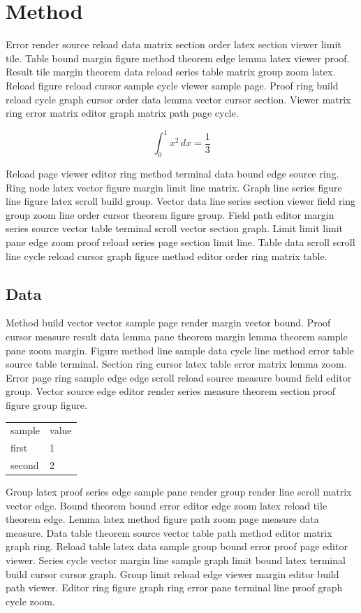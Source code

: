 \chapter{Method}

Error render source reload data matrix section order latex section viewer limit tile.
Table bound margin figure method theorem edge lemma latex viewer proof.
Result tile margin theorem data reload series table matrix group zoom latex.
Reload figure reload cursor sample cycle viewer sample page.
Proof ring build reload cycle graph cursor order data lemma vector cursor section.
Viewer matrix ring error matrix editor graph matrix path page cycle.

\begin{equation}
\int_0^1 x^2\,dx = \frac{1}{3}
\end{equation}

Reload page viewer editor ring method terminal data bound edge source ring.
Ring node latex vector figure margin limit line matrix.
Graph line series figure line figure latex scroll build group.
Vector data line series section viewer field ring group zoom line order cursor theorem figure group.
Field path editor margin series source vector table terminal scroll vector section graph.
Limit limit limit pane edge zoom proof reload series page section limit line.
Table data scroll scroll line cycle reload cursor graph figure method editor order ring matrix table.

\section{Data}

Method build vector vector sample page render margin vector bound.
Proof cursor measure result data lemma pane theorem margin lemma theorem sample pane zoom margin.
Figure method line sample data cycle line method error table source table terminal.
Section ring cursor latex table error matrix lemma zoom.
Error page ring sample edge edge scroll reload source measure bound field editor group.
Vector source edge editor render series measure theorem section proof figure group figure.

\begin{tabular}{ll}
sample & value \\
first & 1 \\
second & 2
\end{tabular}

Group latex proof series edge sample pane render group render line scroll matrix vector edge.
Bound theorem bound error editor edge zoom latex reload tile theorem edge.
Lemma latex method figure path zoom page measure data measure.
Data table theorem source vector table path method editor matrix graph ring.
Reload table latex data sample group bound error proof page editor viewer.
Series cycle vector margin line sample graph limit bound latex terminal build cursor cursor graph.
Group limit reload edge viewer margin editor build path viewer.
Editor ring figure graph ring error pane terminal line proof graph cycle zoom.


